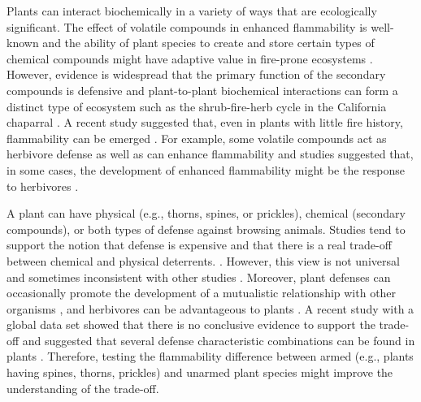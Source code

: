 \documentclass{ttuthes2007}
\begin{document}
Plants can interact biochemically in a variety of ways %
that are ecologically significant\citep{muller1966role}. The effect of volatile compounds in enhanced flammability is well-known \citep{mutch1970wildland,white1994monoterpenes,owens1998seasonal,volatile1,volatile2,volatile3,alam2020shoot,ormeno2009relationship} and the ability of plant species to create and store certain types of chemical compounds might have adaptive value in fire-prone ecosystems \citep{pausas2016secondary}. However, evidence is widespread that the primary function of the secondary compounds is defensive \citep{primaryfunction} and plant-to-plant biochemical interactions can form a distinct type of ecosystem such as the shrub-fire-herb cycle in the California chaparral \citep{allelopathic}. A recent study suggested that, even in plants with little fire history, flammability can be emerged \citep{cui2020shoot}. For example, some volatile compounds act as herbivore defense as well as can enhance flammability and studies suggested that, in some cases, the development of enhanced flammability might be the response to herbivores \citep{white1994monoterpenes, owens1998seasonal}  .

A plant can have physical (e.g., thorns, spines, or prickles), chemical (secondary compounds), or both types of defense against browsing animals. Studies tend to support the notion that defense is expensive and that there is a real trade-off between chemical and physical deterrents. \citep{rhoades1979evolution, van1988defence,twigg1996physicalchemical}. However, this view is not universal and sometimes inconsistent with other studies \citep{iddles2003potentialnegativecorrelation,steward1988theredifferentview,koricheva2004metanegativecorrelation}. Moreover, plant defenses can occasionally promote the development of a mutualistic relationship with other organisms \citep{janzen1966coevolution}, and herbivores can  be advantageous to plants \citep{belsky1986does}. A recent study with a global data set showed that there is no conclusive evidence to support the trade-off and suggested that several defense characteristic combinations can be found in plants \citep{moles2013correlations}. Therefore, testing the flammability difference between armed (e.g., plants having spines, thorns, prickles) and unarmed plant species might improve the understanding of the trade-off.
\end{document}
